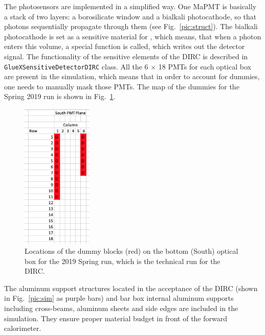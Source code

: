 The photosensors are implemented in a simplified way. One MaPMT is basically a stack of two layers: a borosilicate window and a bialkali photocathode, so that photons sequentially propagate through them (see Fig.~\ref{pic:struct}). The bialkali photocathode is set as a sensitive material for , which means, that when a photon enters this volume, a special function is called, which writes out the detector signal. The functionality of the sensitive elements of the \gluex DIRC is described in \texttt{GlueXSensitiveDetectorDIRC} class. All the 6 $\times$ 18 PMTs for each optical box are present in the simulation, which means that in order to account for dummies, one needs to manually mask those PMTs. The map of the dummies for the Spring 2019 run is shown in Fig.~\ref{pic:dummies}.

\begin{figure}[!h]
\centering
\includegraphics[width=0.3\textwidth]{pics/dummies.png}
\caption{\label{pic:dummies}
Locations of the dummy blocks (red) on the bottom (South) optical box for the 2019 Spring run, which is the technical run for the DIRC.
}
\end{figure}

The aluminum support structures located in the acceptance of the DIRC (shown in Fig.~\ref{pic:sim} as purple bars) and bar box internal aluminum supports including cross-beams, aluminum sheets and side edges are included in the simulation. They ensure proper material budget in front of the forward calorimeter.